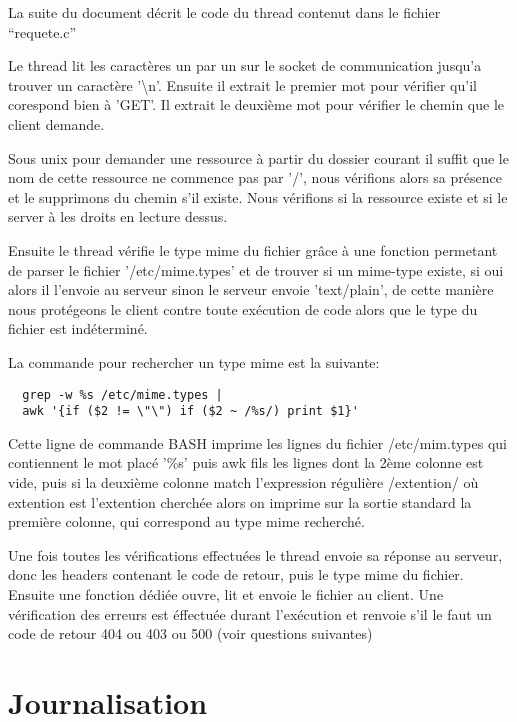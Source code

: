 \documentclass{report}
\begin{document}
La suite du document décrit le code du thread contenut dans le fichier ``requete.c''

Le thread lit les caractères un par un sur le socket de communication jusqu'a trouver un caractère '\textbackslash{}n'.
Ensuite il extrait le premier mot pour vérifier qu'il corespond bien à 'GET'.
Il extrait le deuxième mot pour vérifier le chemin que le client demande.

Sous unix pour demander une ressource à partir du dossier courant il suffit que le nom de cette ressource ne commence pas par '/', nous vérifions alors sa présence et le
supprimons du chemin s'il existe. Nous vérifions si la ressource existe et si le server à les droits en lecture dessus.\hbox{}

Ensuite le thread vérifie le type mime du fichier grâce à une fonction permetant de parser le fichier '/etc/mime.types' et de trouver si un mime-type existe, si oui alors
il l'envoie au serveur sinon le serveur envoie 'text/plain', de cette manière nous protégeons le client contre toute exécution de code alors que le type du fichier est indéterminé.\hbox{}

La commande pour rechercher un type mime est la suivante: \hbox{}
\begin{lstlisting}
  grep -w %s /etc/mime.types |
  awk '{if ($2 != \"\") if ($2 ~ /%s/) print $1}'
\end{lstlisting}

Cette ligne de commande BASH imprime les lignes du fichier /etc/mim.types qui contiennent le mot placé '\%s' puis awk fils les lignes dont la 2ème colonne est vide, puis si la deuxième colonne match l'expression régulière /extention/ où extention est l'extention cherchée alors on imprime sur la sortie standard la première colonne, qui correspond au type mime recherché.\hbox{}

Une fois toutes les vérifications effectuées le thread envoie sa réponse au serveur, donc les headers contenant le code de retour, puis le type mime du fichier.
Ensuite une fonction dédiée ouvre, lit et envoie le fichier au client.
\hbox{}
Une vérification des erreurs est éffectuée durant l'exécution et renvoie s'il le faut un code de retour 404 ou 403 ou 500 (voir questions suivantes)

\section{Journalisation}
\end{document}
